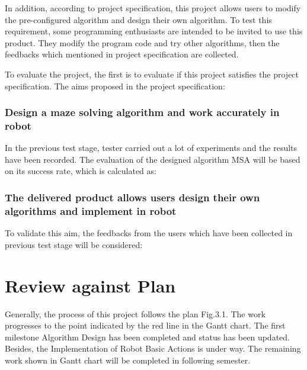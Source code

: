 \documentclass[11pt,times,oneside,openright,hardcopy]{eeereport}
\begin{document}
In addition, according to project specification, this project allows users to modify the pre-configured algorithm and design their own algorithm. To test this requirement, some programming enthusiasts are intended to be invited to use this product.
They modify the program code and try other algorithms, then the feedbacks which mentioned in project specification are collected.

To evaluate the project, the first is to evaluate if this project satisfies the project specification.
The aims proposed in the project specification:

\subsection{Design a maze solving algorithm and work accurately in robot}
In the previous test stage, tester carried out a lot of experiments and the results have been recorded. 
The evaluation of the designed algorithm MSA will be based on its success rate, which is calculated as:

\subsection{The delivered product allows users design their own algorithms and implement in robot}
To validate this aim, the feedbacks from the users which have been collected in previous test stage will be considered:

\chapter{Review against Plan}
Generally, the process of this project follows the plan Fig.3.1. The work progresses to the point indicated by the red line in the Gantt chart. The first milestone Algorithm Design has been completed and status has been updated. 
Besides, the Implementation of Robot Basic Actions is under way. The remaining work shown in Gantt chart will be completed in following semester.





\end{document}
